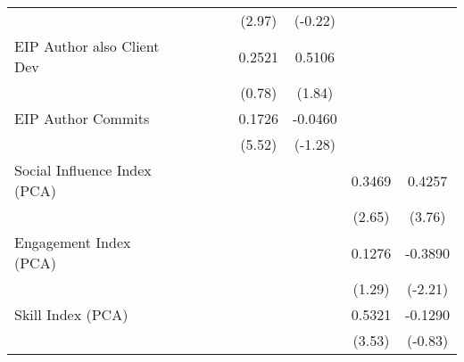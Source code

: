 {\begin{tabular}{l*{8}{c}}
                                   &                   &                   &                   &                   &    (2.97)         &   (-0.22)         &                   &                   \\
[1em]
EIP Author also Client Dev         &                   &                   &                   &                   &    0.2521         &    0.5106\sym{*}  &                   &                   \\
                                   &                   &                   &                   &                   &    (0.78)         &    (1.84)         &                   &                   \\
[1em]
EIP Author Commits                 &                   &                   &                   &                   &    0.1726\sym{***}&   -0.0460         &                   &                   \\
                                   &                   &                   &                   &                   &    (5.52)         &   (-1.28)         &                   &                   \\
[1em]
Social Influence Index (PCA)       &                   &                   &                   &                   &                   &                   &    0.3469\sym{***}&    0.4257\sym{***}\\
                                   &                   &                   &                   &                   &                   &                   &    (2.65)         &    (3.76)         \\
[1em]
Engagement Index (PCA)             &                   &                   &                   &                   &                   &                   &    0.1276         &   -0.3890\sym{**} \\
                                   &                   &                   &                   &                   &                   &                   &    (1.29)         &   (-2.21)         \\
[1em]
Skill Index (PCA)                  &                   &                   &                   &                   &                   &                   &    0.5321\sym{***}&   -0.1290         \\
                                   &                   &                   &                   &                   &                   &                   &    (3.53)         &   (-0.83)         \\

\end{tabular}}
